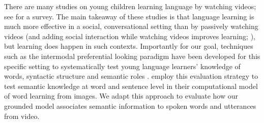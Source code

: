  There are many studies on young children learning language by watching videos; see \cite{vanderplank2010deja} for a survey. The main takeaway of these studies is that language learning is much more effective in a social, conversational setting than by passively watching videos \cite{kuhl2003foreign,anderson2005television,robb2009just} (and adding social interaction while watching videos improves learning; \citet{lytle2018two}), but learning does happen in such contexts. Importantly for our goal, techniques such as the intermodal preferential looking paradigm have been developed for this specific setting to systematically test young language learners' knowledge of words, syntactic structure and semantic roles \cite{hirsh1996intermodal,bergelson20126,noble2011comprehension}. \citet{nikolaus-fourtassi-2021-evaluating} employ this evaluation strategy to test semantic knowledge at word and sentence level in their computational model of word learning from images. We adapt this approach to evaluate how our grounded model associates semantic information to spoken words and utterances from video. 
 
 





